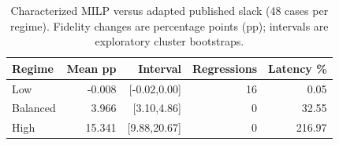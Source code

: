 \begin{table}[t]
\caption{Characterized MILP versus adapted published slack (48 cases per regime). Fidelity changes are percentage points (pp); intervals are exploratory cluster bootstraps.}\label{tab:physical}
\centering\small\setlength{\tabcolsep}{4pt}
\begin{tabular}{lrrrr}\toprule
Regime & Mean pp & Interval & Regressions & Latency \%\\\midrule
Low & -0.008 & [-0.02,0.00] & 16 & 0.05\\
Balanced & 3.966 & [3.10,4.86] & 0 & 32.55\\
High & 15.341 & [9.88,20.67] & 0 & 216.97\\
\bottomrule\end{tabular}\end{table}
